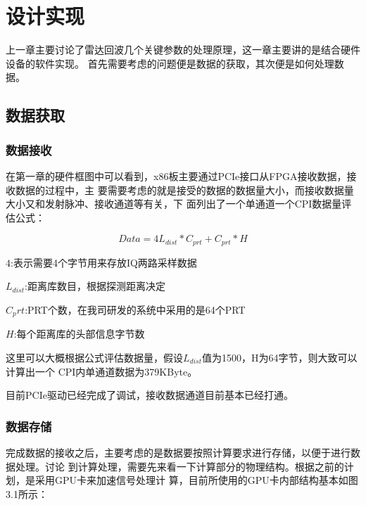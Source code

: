 \documentclass[a4paper,12pt]{report}
\begin{document}
\chapter{设计实现}
\begin{spacing}{1.5}
\songti{}

上一章主要讨论了雷达回波几个关键参数的处理原理，这一章主要讲的是结合硬件设备的软件实现。
首先需要考虑的问题便是数据的获取，其次便是如何处理数据。
\section{数据获取}
\subsection{数据接收}
在第一章的硬件框图中可以看到，x86板主要通过PCIe接口从FPGA接收数据，接收数据的过程中，主
要需要考虑的就是接受的数据的数据量大小，而接收数据量大小又和发射脉冲、接收通道等有关，下
面列出了一个单通道一个CPI数据量评估公式：

    \begin{proposition}[数据量算公式]

    \begin{equation}
        Data=4L_{dist}*C_{prt}+C_{prt}*H
    \end{equation}

    $4$:表示需要4个字节用来存放IQ两路采样数据

    $L_{dist}$:距离库数目，根据探测距离决定

    $C_prt$:PRT个数，在我司研发的系统中采用的是64个PRT

    $H$:每个距离库的头部信息字节数

    \end{proposition}

这里可以大概根据公式评估数据量，假设$L_{dist}$值为1500，H为64字节，则大致可以计算出一个
CPI内单通道数据为379KByte。

目前PCIe驱动已经完成了调试，接收数据通道目前基本已经打通。

\subsection{数据存储}
完成数据的接收之后，主要考虑的是数据要按照计算要求进行存储，以便于进行数据处理。讨论
到计算处理，需要先来看一下计算部分的物理结构。根据之前的计划，是采用GPU卡来加速信号处理计
算，目前所使用的GPU卡内部结构基本如图3.1\cite{CudaGuide}所示：


\end{spacing}
\end{document}
